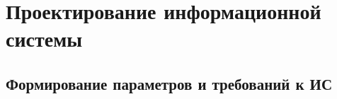 \section{Проектирование информационной системы}

\subsection{Формирование параметров и требований к ИС}

\pagebreak